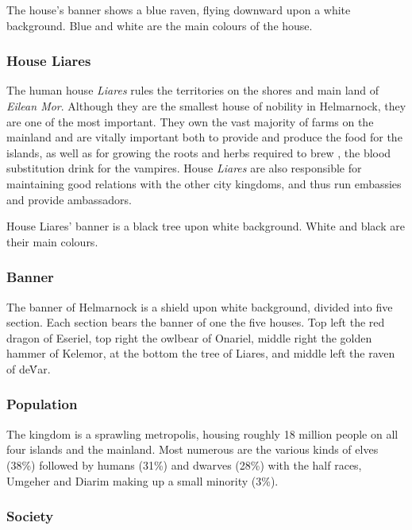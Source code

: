 The house's banner shows a blue raven, flying downward upon a white
background.  Blue and white are the main colours of the house.

\subsubsection{House Liares}
\label{sec:House Liares}

The human house \emph{Liares} rules the territories on the shores and main
land of \emph{Eilean Mor}. Although they are the smallest house of nobility in
Helmarnock, they are one of the most important. They own the vast majority of
farms on the mainland and are vitally important both to provide and produce
the food for the islands, as well as for growing the roots and herbs required
to brew , the blood substitution drink for the
vampires. House \emph{Liares} are also responsible for maintaining good
relations with the other city kingdoms, and thus run embassies and provide
ambassadors.

House Liares' banner is a black tree upon white background. White and black
are their main colours.

\subsubsection{Banner}

The banner of Helmarnock is a shield upon white background, divided into five
section. Each section bears the banner of one the five houses. Top left the
red dragon of Eseriel, top right the owlbear of Onariel, middle right the
golden hammer of Kelemor, at the bottom the tree of Liares, and middle left
the raven of de\'Var.

\subsubsection{Population}

The kingdom is a sprawling metropolis, housing roughly 18 million people on
all four islands and the mainland. Most numerous are the various kinds of
elves (38\%) followed by humans (31\%) and dwarves (28\%) with the half
races, Umgeher and Diarim making up a small minority (3\%).

\subsubsection{Society}

